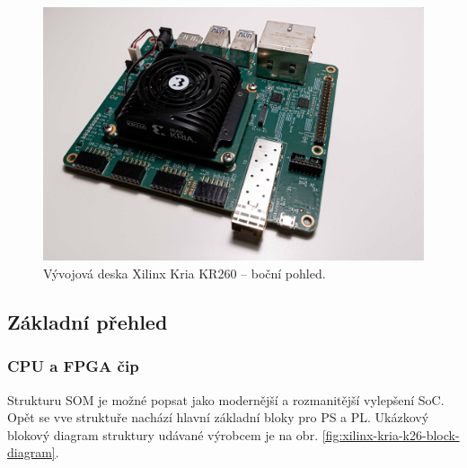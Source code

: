 \documentclass[a4paper, twoside, 11pt]{article}
\begin{document}
				\begin{figure}[H]
					\centering
						\includegraphics[width=1\textwidth]{src/jpg/xilinx-kria-foto-1.jpeg} 
						\caption{Vývojová deska Xilinx Kria KR260 – boční pohled.}
						\label{fig:xilinx-kria-foto-1}
				\end{figure}

				\subsection{Základní přehled}
					\subsubsection{CPU a FPGA čip}
						Strukturu SOM je možné popsat jako modernější a rozmanitější vylepšení SoC. Opět se vve struktuře nachází hlavní základní bloky pro PS a PL. Ukázkový blokový diagram struktury udávané výrobcem je na obr. \ref{fig:xilinx-kria-k26-block-diagram}.
\end{document}

